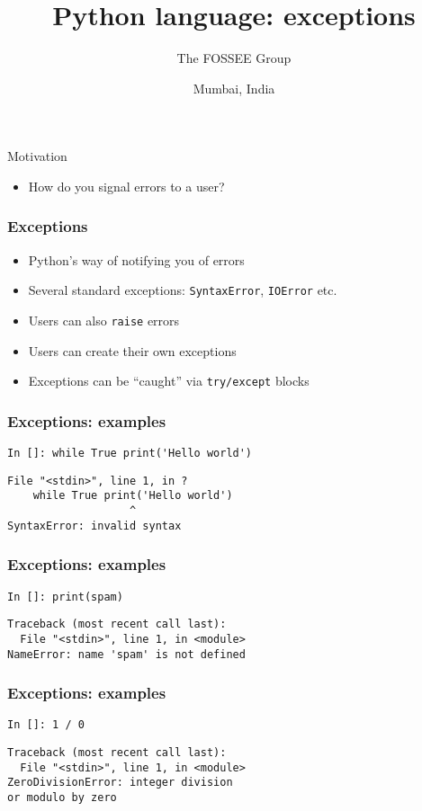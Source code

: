 \documentclass[14pt,compress]{beamer}
\title[Exceptions]{Python language: exceptions}
\author[FOSSEE Team] {The FOSSEE Group}
\institute[IIT Bombay] {Department of Aerospace Engineering\\IIT Bombay}
\date[] {Mumbai, India}
\begin{document}
\begin{frame}
  \titlepage
\end{frame}

\begin{frame}{Motivation}
    \begin{itemize}
        \item How do you signal errors to a user?
    \end{itemize}
\end{frame}

\begin{frame}
  \frametitle{Exceptions}
  \begin{itemize}
  \item Python's way of notifying you of errors
  \item Several standard exceptions: \texttt{SyntaxError}, \texttt{IOError}
    etc.
  \item Users can also \texttt{raise} errors
  \item Users can create their own exceptions
  \item Exceptions can be ``caught'' via \texttt{try/except} blocks
  \end{itemize}
\end{frame}

\begin{frame}[fragile]
 \frametitle{Exceptions: examples}
 \begin{lstlisting}
In []: while True print('Hello world')
 \end{lstlisting}
\pause
  \begin{lstlisting}
File "<stdin>", line 1, in ?
    while True print('Hello world')
                   ^
SyntaxError: invalid syntax
\end{lstlisting}
\end{frame}

\begin{frame}[fragile]
 \frametitle{Exceptions: examples}
 \begin{lstlisting}
In []: print(spam)
\end{lstlisting}
\pause
\begin{lstlisting}
Traceback (most recent call last):
  File "<stdin>", line 1, in <module>
NameError: name 'spam' is not defined
\end{lstlisting}
\end{frame}

\begin{frame}[fragile]
 \frametitle{Exceptions: examples}
 \begin{lstlisting}
In []: 1 / 0
\end{lstlisting}
\pause
\begin{lstlisting}
Traceback (most recent call last):
  File "<stdin>", line 1, in <module>
ZeroDivisionError: integer division
or modulo by zero
\end{lstlisting}
\end{frame}
\end{document}
